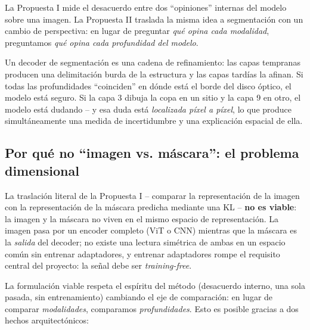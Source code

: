 \documentclass[12pt,a4paper]{article}
\begin{document}
La Propuesta I mide el desacuerdo entre dos ``opiniones'' internas del modelo sobre una imagen.
La Propuesta II traslada la misma idea a segmentación con un cambio de perspectiva: en lugar de preguntar \emph{qué opina cada modalidad}, preguntamos \emph{qué opina cada profundidad del modelo}.

Un decoder de segmentación es una cadena de refinamiento: las capas tempranas producen una delimitación burda de la estructura y las capas tardías la afinan.
Si todas las profundidades ``coinciden'' en dónde está el borde del disco óptico, el modelo está seguro.
Si la capa 3 dibuja la copa en un sitio y la capa 9 en otro, el modelo está dudando -- y esa duda está \emph{localizada píxel a píxel}, lo que produce simultáneamente una medida de incertidumbre y una explicación espacial de ella.

\subsection{Por qué no ``imagen vs. máscara'': el problema dimensional}

La traslación literal de la Propuesta I -- comparar la representación de la imagen con la representación de la máscara predicha mediante una KL -- \textbf{no es viable}: la imagen y la máscara no viven en el mismo espacio de representación.
La imagen pasa por un encoder completo (ViT o CNN) mientras que la máscara es la \emph{salida} del decoder; no existe una lectura simétrica de ambas en un espacio común sin entrenar adaptadores, y entrenar adaptadores rompe el requisito central del proyecto: la señal debe ser \textit{training-free}.

La formulación viable respeta el espíritu del método (desacuerdo interno, una sola pasada, sin entrenamiento) cambiando el eje de comparación: en lugar de comparar \emph{modalidades}, comparamos \emph{profundidades}.
Esto es posible gracias a dos hechos arquitectónicos:
\end{document}
